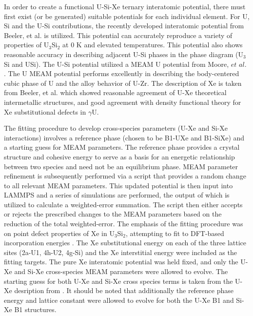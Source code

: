 \documentclass[review]{elsarticle}
\begin{document}
In order to create a functional U-Si-Xe ternary interatomic potential, there must first exist (or be generated) suitable potentials for each individual element. For U, Si and the U-Si contributions, the recently developed interatomic potential from Beeler, et al. \cite{beelerusi} is utilized. This potential can accurately reproduce a variety of properties of U$_3$Si$_2$ at 0 K and elevated temperatures. This potential also shows reasonable accuracy in describing adjacent U-Si phases in the phase diagram (U$_3$Si and USi). The U-Si potential utilized a MEAM U potential from Moore, $\textit{et al.}$ \cite{moore2015}. The U MEAM potential performs excellently in describing the body-centered cubic phase of U and the alloy behavior of U-Zr. The description of Xe is taken from Beeler, et al. \cite{beelerASTM} which showed reasonable agreement of U-Xe theoretical intermetallic structures, and good agreement with density functional theory for Xe substitutional defects in $\gamma$U. 

The fitting procedure to develop cross-species parameters (U-Xe and Si-Xe interactions) involves a reference phase (chosen to be B1-UXe and B1-SiXe) and a starting guess for MEAM parameters. The reference phase provides a crystal structure and cohesive energy to serve as a basis for an energetic relationship between two species and need not be an equilibrium phase. MEAM parameter refinement is subsequently performed via a script that provides a random change to all relevant MEAM parameters. This updated potential is then input into LAMMPS \cite{plimpton1995} and a series of simulations are performed, the output of which is utilized to calculate a weighted-error summation. The script then either accepts or rejects the prescribed changes to the MEAM parameters based on the reduction of the total weighted-error. The emphasis of the fitting procedure was on point defect properties of Xe in U$_{3}$Si$_{2}$, attempting to fit to DFT-based incorporation energies \cite{andersson2018}. The Xe substitutional energy on each of the three lattice sites (2a-U1, 4h-U2, 4g-Si) and the Xe interstitial energy were included as the fitting targets. The pure Xe interatomic potential was held fixed, and only the U-Xe and Si-Xe cross-species MEAM parameters were allowed to evolve. The starting guess for both U-Xe and Si-Xe cross species terms is taken from the U-Xe desription from \cite{beelerASTM}. It should be noted that additionally the reference phase energy and lattice constant were allowed to evolve for both the U-Xe B1 and Si-Xe B1 structures.
\end{document}

